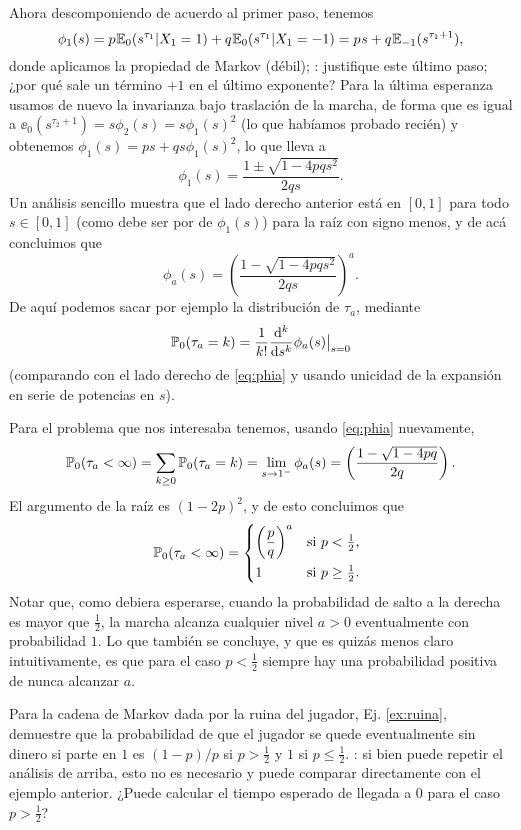 Ahora descomponiendo de acuerdo al primer paso, tenemos
\[\phi_1(s)=p\hspace{0.05em}\mathbb{E}_0(s^{\tau_1}|X_1=1)+q\hspace{0.05em}\mathbb{E}_0(s^{\tau_1}|X_1=-1)=p\hspace{0.05em} s+q\hspace{0.05em}\mathbb{E}_{-1}(s^{\tau_1+1}),\]
donde aplicamos la propiedad de Markov (débil); \uexers: justifique este último paso; ¿por qué sale un término $+1$ en el último exponente?
Para la última esperanza usamos de nuevo la invarianza bajo traslación de la marcha, de forma que es igual a $\ee_{0}(s^{\tau_2+1})=s\phi_2(s)=s\phi_1(s)^2$ (lo que habíamos probado recién) y obtenemos $\phi_1(s)=ps+qs\phi_1(s)^2$, lo que lleva a 
\[\phi_1(s)=\frac{1\pm\sqrt{1-4pqs^2}}{2qs}.\]
Un análisis sencillo muestra que el lado derecho anterior está en $[0,1]$ para todo $s\in[0,1]$ (como debe ser por de $\phi_1(s)$) para la raíz con signo menos, y de acá concluimos que
\[\phi_a(s)=\left(\frac{1-\sqrt{1-4pqs^2}}{2qs}\right)^a.\]
De aquí podemos sacar por ejemplo la distribución de $\tau_a$, mediante
\[\mathbb{P}_0(\tau_a=k)=\frac{1}{k!}\frac{\mathrm{d}^k}{\mathrm{d} s^k}\phi_a(s)\big|_{s=0}\]
(comparando con el lado derecho de \eqref{eq:phia} y usando unicidad de la expansión en serie de potencias en $s$).

Para el problema que nos interesaba tenemos, usando \eqref{eq:phia} nuevamente,
\[\mathbb{P}_0(\tau_a<\infty)=\sum_{k\geq0}\mathbb{P}_0(\tau_a=k)=\lim_{s\to1^-}\phi_a(s)=\left(\frac{1-\sqrt{1-4pq}}{2q}\right).\]
El argumento de la raíz es $(1-2p)^2$, y de esto concluimos que
\[\pp_0(\tau_a<\infty)=
\begin{dcases*}
\left(\frac{p}{q}\right)^a & si $p<\tfrac12$,\\
1 & si $p\geq\tfrac12$.
\end{dcases*}\]
Notar que, como debiera esperarse, cuando la probabilidad de salto a la derecha es mayor que $\frac12$, la marcha alcanza cualquier nivel $a>0$ eventualmente con probabilidad $1$.
Lo que también se concluye, y que es quizás menos claro intuitivamente, es que para el caso $p<\frac12$ siempre hay una probabilidad positiva de nunca alcanzar $a$.

\begin{ex}
Para la cadena de Markov dada por la ruina del jugador, Ej. \ref{ex:ruina}, demuestre que la probabilidad de que el jugador se quede eventualmente sin dinero si parte en $1$ es $(1-p)/p$ si $p>\frac12$ y $1$ si $p\leq\frac12$.
\uindic: si bien puede repetir el análisis de arriba, esto no es necesario y puede comparar directamente con el ejemplo anterior.
¿Puede calcular el tiempo esperado de llegada a $0$ para el caso $p>\frac12$?
\end{ex}

